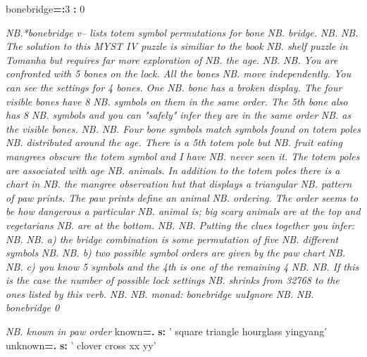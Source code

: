 \documentclass[]{article}
\newenvironment{Shaded}{\begin{snugshade}}{\end{snugshade}}
\newcommand{\KeywordTok}[1]{\textcolor[rgb]{0.13,0.29,0.53}{\textbf{{#1}}}}
\newcommand{\StringTok}[1]{\textcolor[rgb]{0.31,0.60,0.02}{{#1}}}
\newcommand{\CommentTok}[1]{\textcolor[rgb]{0.56,0.35,0.01}{\textit{{#1}}}}
\newcommand{\NormalTok}[1]{{#1}}
\begin{document}
\begin{Shaded}
\begin{Highlighting}[]
\NormalTok{bonebridge}\KeywordTok{=:}\NormalTok{3 }\KeywordTok{:} \NormalTok{0}

\CommentTok{NB.*bonebridge  v--  lists  totem  symbol  permutations for  bone}
\CommentTok{NB. bridge.}
\CommentTok{NB.}
\CommentTok{NB. The  solution to  this MYST IV puzzle is similiar to the book}
\CommentTok{NB. shelf puzzle in Tomanha but requires far more  exploration of}
\CommentTok{NB. the age.}
\CommentTok{NB.}
\CommentTok{NB. You are confronted with  5  bones on the lock.  All the bones}
\CommentTok{NB. move independently. You can see the settings for 4 bones. One}
\CommentTok{NB. bone  has a  broken display.  The four  visible bones  have 8}
\CommentTok{NB. symbols on them in the  same order.  The  5th bone also has 8}
\CommentTok{NB. symbols and you can "safely" infer they are in the same order}
\CommentTok{NB. as the visible bones.}
\CommentTok{NB.}
\CommentTok{NB. Four  bone  symbols   match  symbols  found  on  totem  poles}
\CommentTok{NB. distributed around the  age. There is a  5th  totem pole  but}
\CommentTok{NB. fruit eating mangrees  obscure  the  totem symbol and  I have}
\CommentTok{NB. never  seen it.  The  totem  poles are  associated  with  age}
\CommentTok{NB. animals. In addition to the totem poles  there is  a chart in}
\CommentTok{NB. the  mangree  observation  hut  that  displays  a  triangular}
\CommentTok{NB. pattern  of paw  prints.  The  paw  prints  define an  animal}
\CommentTok{NB. ordering. The order  seems to be how  dangerous a  particular}
\CommentTok{NB. animal is;  big scary animals  are at the top and vegetarians}
\CommentTok{NB. are at the bottom.}
\CommentTok{NB.}
\CommentTok{NB. Putting the clues together you infer:}
\CommentTok{NB.}
\CommentTok{NB. a)  the  bridge  combination  is  some  permutation  of  five}
\CommentTok{NB. different symbols}
\CommentTok{NB.}
\CommentTok{NB. b) two possible symbol orders are given by the paw chart}
\CommentTok{NB.}
\CommentTok{NB. c) you know 5 symbols and the 4th is one of the remaining 4}
\CommentTok{NB.}
\CommentTok{NB. If this is  the  case  the number of  possible  lock settings}
\CommentTok{NB. shrinks from 32768 to the ones listed by this verb.}
\CommentTok{NB.}
\CommentTok{NB. monad:  bonebridge uuIgnore}
\CommentTok{NB.}
\CommentTok{NB.   bonebridge 0}

\CommentTok{NB. known in paw order}
\NormalTok{known}\KeywordTok{=.}    \KeywordTok{s:} \StringTok{' square triangle hourglass yingyang'}
\NormalTok{unknown}\KeywordTok{=.}  \KeywordTok{s:} \StringTok{' clover cross xx yy'}


\end{Highlighting}
\end{Shaded}
\end{document}
